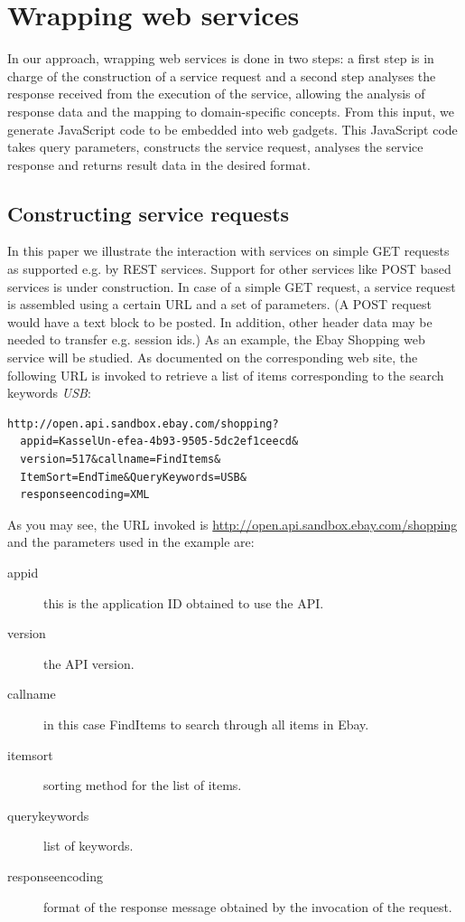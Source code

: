 
\section{Wrapping web services}
\label{sec:wrapping_web_services}

In our approach, wrapping web services is done in two steps: a first step is in charge of the construction of a service request and a second step analyses the response received from the execution of the service, allowing the analysis of response data and the mapping to domain-specific concepts. From this input, we generate JavaScript code to be embedded into web gadgets. This JavaScript code takes query parameters, constructs the service request, analyses the service response and returns result data in the desired format. 

\subsection{Constructing service requests} %
\label{sub:constructing_service_requests}

In this paper we illustrate the interaction with services on simple GET requests as supported e.g. by REST services. Support for other services like POST based services is under construction. In case of a simple GET request, a service request is assembled using a certain URL and a set of parameters. (A POST request would have a text block to be posted. In addition, other header data may be needed to transfer e.g. session ids.) As an example, the Ebay Shopping web service will be studied. As documented on the corresponding web site, the following URL is invoked to retrieve a list of items corresponding to the search keywords \emph{USB}:

\begin{listing}
\begin{verbatim}
http://open.api.sandbox.ebay.com/shopping?
  appid=KasselUn-efea-4b93-9505-5dc2ef1ceecd&
  version=517&callname=FindItems&
  ItemSort=EndTime&QueryKeywords=USB&
  responseencoding=XML
\end{verbatim}
\end{listing}

As you may see, the URL invoked is \url{http://open.api.sandbox.ebay.com/shopping} and the parameters used in the example are:
\begin{description}
	\item[appid] this is the application ID obtained to use the API.
	\item[version] the API version.
	\item[callname] in this case FindItems to search through all items in Ebay.
	\item[itemsort] sorting method for the list of items.
	\item[querykeywords] list of keywords.
	\item[responseencoding] format of the response message obtained by the invocation of the request.
\end{description}

